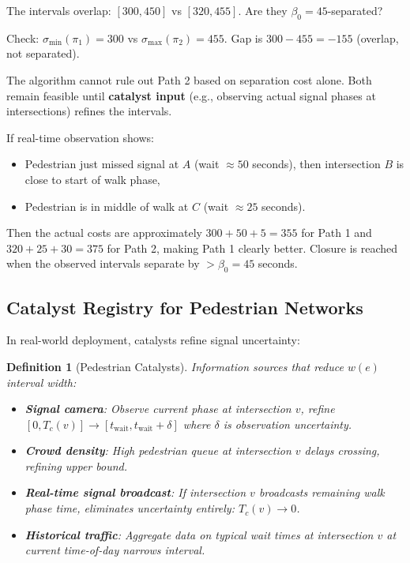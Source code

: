 \documentclass[twocolumn,11pt,a4paper]{article}
\newtheorem{definition}[theorem]{Definition}
\theoremstyle{definition}
\begin{document}
The intervals overlap: $[300, 450]$ vs $[320, 455]$. Are they $\beta_0 = 45$-separated?

Check: $\sigma_{\min}(\pi_1) = 300$ vs $\sigma_{\max}(\pi_2) = 455$. Gap is $300 - 455 = -155$ (overlap, not separated).

The algorithm cannot rule out Path 2 based on separation cost alone. Both remain feasible until \textbf{catalyst input} (e.g., observing actual signal phases at intersections) refines the intervals.

If real-time observation shows:
\begin{itemize}
\item Pedestrian just missed signal at $A$ (wait $\approx 50$ seconds), then intersection $B$ is close to start of walk phase,
\item Pedestrian is in middle of walk at $C$ (wait $\approx 25$ seconds).
\end{itemize}

Then the actual costs are approximately $300 + 50 + 5 = 355$ for Path 1 and $320 + 25 + 30 = 375$ for Path 2, making Path 1 clearly better. Closure is reached when the observed intervals separate by $>\beta_0 = 45$ seconds.

\subsection{Catalyst Registry for Pedestrian Networks}

In real-world deployment, catalysts refine signal uncertainty:

\begin{definition}[Pedestrian Catalysts]
Information sources that reduce $w(e)$ interval width:
\begin{itemize}
\item \textbf{Signal camera}: Observe current phase at intersection $v$, refine $[0, T_c(v)] \to [t_{\text{wait}}, t_{\text{wait}} + \delta]$ where $\delta$ is observation uncertainty.
\item \textbf{Crowd density}: High pedestrian queue at intersection $v$ delays crossing, refining upper bound.
\item \textbf{Real-time signal broadcast}: If intersection $v$ broadcasts remaining walk phase time, eliminates uncertainty entirely: $T_c(v) \to 0$.
\item \textbf{Historical traffic}: Aggregate data on typical wait times at intersection $v$ at current time-of-day narrows interval.
\end{itemize}
\end{definition}
\end{document}

